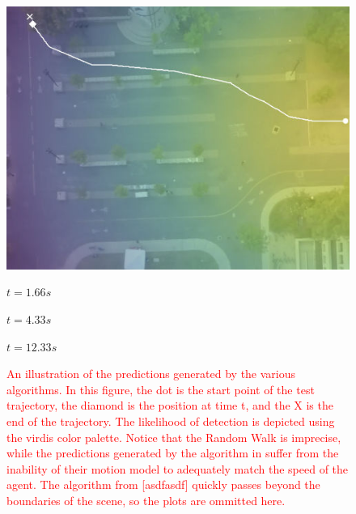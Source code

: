 \documentclass[letterpaper,10pt,conference]{ieeeconf}
\newcommand{\rtext}[1]{\textcolor{red}{#1}}
\begin{document}
\begin{figure}
\begin{minipage}[c]{0.3\linewidth}
		\includegraphics[width=\linewidth]{./figures/bookstore/rand_1_2_t=370.jpg}
	\end{minipage}
	
	\vspace{0.2cm}
	\hspace{.5cm}
	\begin{minipage}{0.3\linewidth}
		\centering
		$t = 1.66s$
	\end{minipage}
	\begin{minipage}{0.3\linewidth}
		\centering
		$t = 4.33s$
	\end{minipage}
	\begin{minipage}{0.3\linewidth}
		\centering
		$t = 12.33s$
	\end{minipage}
	
	\caption{\rtext{An illustration of the predictions generated by the various algorithms. In this figure, the dot is the start point of the test trajectory, the diamond is the position at time t, and the X is the end of the trajectory. The likelihood of detection is depicted using the virdis color palette. Notice that the Random Walk is imprecise, while the predictions generated by the algorithm in \cite{Kitani2012} suffer from the inability of their motion model to adequately match the speed of the agent. The algorithm from [asdfasdf] quickly passes beyond the boundaries of the scene, so the plots are ommitted here.}}
	
	\label{fig:bookstore-1-2}
\end{figure}
\end{document}
